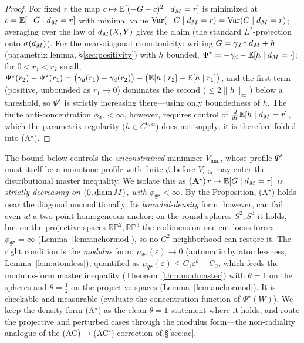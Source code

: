 \begin{proof}
For fixed $r$ the map $c\mapsto\mathbb E[(-G-c)^2\mid d_M=r]$ is minimized at $c=\mathbb E[-G\mid d_M=r]$
with minimal value $\operatorname{Var}(-G\mid d_M=r)=\operatorname{Var}(G\mid d_M=r)$; averaging over the law of $d_M(X,Y)$
gives the claim (the standard $L^2$-projection onto $\sigma(d_M)$). For the near-diagonal
monotonicity: writing $G=\gamma_d\circ d_M+h$ (parametrix lemma, \S\ref{sec:positivity}) with
$h$ bounded, $\Psi^\star=-\gamma_d-\mathbb E[h\mid d_M=\cdot]$; for $0<r_1<r_2$ small,
$\Psi^\star(r_2)-\Psi^\star(r_1)=\bigl(\gamma_d(r_1)-\gamma_d(r_2)\bigr)-\bigl(\mathbb E[h\mid r_2]
-\mathbb E[h\mid r_1]\bigr)$, and the first term (positive, unbounded as $r_1\to0$) dominates the
second ($\le2\lVert h\rVert_\infty$) below a threshold, so $\Psi^\star$ is strictly
increasing there---using only boundedness of $h$. The finite anti-concentration
$\phi_{\Psi^\star}<\infty$, however, requires control of $\tfrac{d}{dr}\mathbb E[h\mid d_M=r]$, which
the parametrix regularity ($h\in C^{0,\alpha}$) does not supply; it is therefore folded into
(A$^\star$).
\end{proof}

\begin{remark}\label{rem:astar}
The bound below controls the \emph{unconstrained} minimizer $V_{\min}$, whose profile
$\Psi^\star$ must itself be a monotone profile with finite $\phi$ before $V_{\min}$ may enter
the distributional master inequality. We isolate this as
\smallskip
\noindent\textbf{(A$^\star$)}\quad \emph{$r\mapsto\mathbb E[G\mid d_M=r]$ is strictly decreasing on
$(0,\operatorname{diam} M)$, with $\phi_{\Psi^\star}<\infty$.}
\smallskip
By the Proposition, (A$^\star$) holds near the diagonal unconditionally. Its
\emph{bounded-density} form, however, can fail even \emph{at} a two-point homogeneous anchor:
on the round spheres $S^2,S^3$ it holds, but on the projective spaces
$\mathbb{RP}^2,\mathbb{RP}^3$ the codimension-one cut locus forces $\phi_{\Psi^\star}=\infty$
(Lemma~\ref{lem:anchormod}), so no $C^2$-neighborhood can restore it. The right condition is
the \emph{modulus} form: $\mu_{\Psi^\star}(\varepsilon)\to0$ (automatic by atomlessness,
Lemma~\ref{lem:atomless}), quantified as $\mu_{\Psi^\star}(\varepsilon)\le C_1\varepsilon^\theta
+C_2$, which feeds the modulus-form master inequality (Theorem~\ref{thm:modmaster}) with
$\theta=1$ on the spheres and $\theta=\tfrac12$ on the projective spaces
(Lemma~\ref{lem:anchormod}). It is checkable and measurable (evaluate the concentration
function of $\Psi^\star(W)$). We keep the density-form (A$^\star$) as the clean $\theta=1$
statement where it holds, and route the projective and perturbed cases through the modulus
form---the non-radiality analogue of the (AC)$\to$(AC$'$) correction of \S\ref{sec:ac}.
\end{remark}

